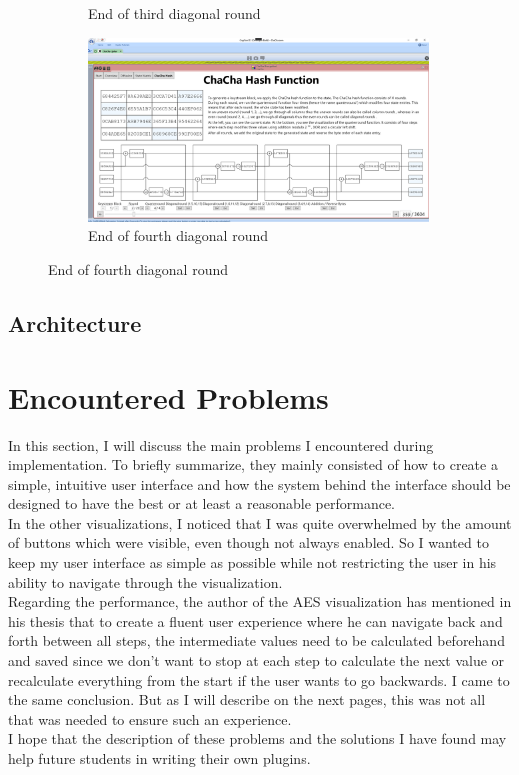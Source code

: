 \begin{figure}
\begin{subfigure}{0.5\textwidth}
  \caption{End of third diagonal round}
  \label{fig:chachahash.dr.3}
\end{subfigure}%
\begin{subfigure}{0.5\textwidth}
  \centering
  \includegraphics[width=0.99\textwidth]{figures/chachahash/chachahash-dr4-end}
  \caption{End of fourth diagonal round}
  \label{fig:chachahash.dr.4}
\end{subfigure}

\end{figure}

\subsection{Architecture}
\label{sec:Architecture}


\section{Encountered Problems}
\label{sec:encounteredProblems}

In this section, I will discuss the main problems I encountered during implementation. To briefly summarize, they mainly consisted of how to create a simple, intuitive user interface and how the system behind the interface should be designed to have the best or at least a reasonable performance. \\
In the other visualizations, I noticed that I was quite overwhelmed by the amount of buttons which were visible, even though not always enabled. So I wanted to keep my user interface as simple as possible while not restricting the user in his ability to navigate through the visualization. \\
Regarding the performance, the author of the AES visualization has mentioned in his thesis that to create a fluent user experience where he can navigate back and forth between all steps, the intermediate values need to be calculated beforehand and saved since we don't want to stop at each step to calculate the next value or recalculate everything from the start if the user wants to go backwards. I came to the same conclusion. But as I will describe on the next pages, this was not all that was needed to ensure such an experience.\\
I hope that the description of these problems and the solutions I have found may help future students in writing their own plugins.

